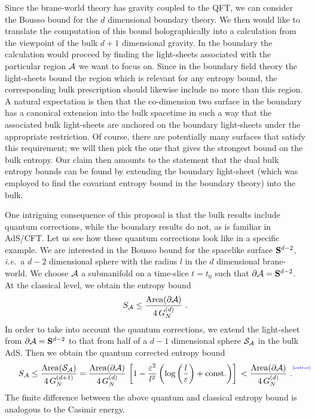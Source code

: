 \documentclass[12pt]{article}
\newcommand{\be}{\begin{equation}}
\newcommand{\ee}{\end{equation}}
\def\ie{{\it i.e.}}
\def\veps{\varepsilon}
\def\CA{{\cal A}}
\def\CS{{\cal S}}
\def\Sp{{\bf S}}
\def\f#1#2{{\frac{#1}{#2}}}
\def\f#1#2{{\frac{#1}{#2}}}
\def\Label#1{\label{#1}%
{ \color{blue}{\smash{\hbox to0pt{\raise2ex\hbox{\tiny[#1]}\hss}}}}}
\def\ms{\CS}
\def\rA{\CA}
\def\area#1{{\rm Area}(#1)}
\def\cof{{\veps}}
\def\de{\partial}
\def\f {\frac}
\begin{document}
Since the brane-world theory has gravity coupled to the QFT, we can
consider the Bousso bound  for the $d$ dimensional boundary theory. We then would like to translate the computation of this bound holographically into a calculation from the viewpoint of the bulk  $d+1$ dimensional gravity. In the boundary the calculation would proceed by finding the light-sheets associated with the particular region $\rA$ we want to focus on.  Since in the boundary field theory the  light-sheets bound the region which is relevant for any entropy bound, the corresponding bulk prescription should likewise include no more than this region. A natural expectation  is then that the co-dimension two surface in the boundary has a canonical extension into the bulk spacetime in such a way that the associated bulk light-sheets are anchored on the boundary light-sheets under the appropriate restriction. Of course, there are potentially many surfaces that satisfy this requirement; we will then  pick the one that gives the strongest bound on the bulk entropy. Our claim then amounts to the statement that the dual bulk entropy bounds can be found by extending the boundary light-sheet (which was employed to find the covariant entropy bound in the boundary theory) into the bulk.

One intriguing consequence of this proposal is  that the bulk
results include quantum corrections, while the boundary results do
not, as is familiar in AdS/CFT. Let us see how these quantum
corrections look like in a specific example. We are interested in
the Bousso bound for the spacelike surface $\Sp^{d-2}$, \ie\ a $d-2$
dimensional sphere with the radius $l$ in the $d$ dimensional
brane-world. We choose $\rA$  a submanifold on a time-slice $t=t_0$
 such that $\de \rA=\Sp^{d-2}$. At the
classical level, we obtain the entropy bound
%
\be S_\rA\leq \f{\area{\de\rA}}{4\, G^{(d)}_N} \ . \ee
%
In order to take into account the quantum corrections, we extend the
light-sheet from $\de\rA=\Sp^{d-2}$ to that from half of a $d-1$ dimensional
sphere $\ms_\rA$ in the bulk AdS. Then we obtain the quantum
corrected entropy bound
%
\begin{equation}
S_\rA\leq \f{\area{\ms_\rA}}{4\, G^{(d+1)}_N}=\f{\area{\de\rA}}{4\,
G^{(d)}_N} \,
\left[1-\f{\cof^2}{l^2}\left(\log\left(\f{l}{\cof}\right)+{\rm
const.}\right)\right] \, < \f{\area{\de\rA}}{4\, G^{(d)}_N} \ .
\Label{entros}
\end{equation}
%
The finite difference between the above quantum and classical
entropy bound is analogous to the Casimir energy.
\end{document}
